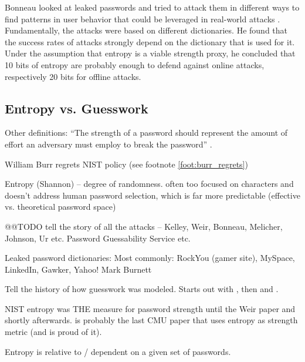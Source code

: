 Bonneau looked at leaked passwords and tried to attack them in different ways to find patterns in user behavior that could be leveraged in real-world attacks \cite{Bonneau2012ScienceOfGuessing}. Fundamentally, the attacks were based on different dictionaries. He found that the success rates of attacks strongly depend on the dictionary that is used for it. Under the assumption that entropy is a viable strength proxy, he concluded that 10 bits of entropy are probably enough to defend against online attacks, respectively 20 bits for offline attacks. 

\cite{Peisert2013PriciplesAuthentication,Bonneau2012ScienceOfGuessing,Scott1995GDMS,Dellamico2015MonteCarlo,Ur2015MeasuringRealWorldAccuracies,Egelman2015SeBIS,Conklin2004PWAuthenticationSystemPerspective,Schmidt2013Pitfalls,Kelley2012GuessAgain,Mazurek2013Measuring,Weir2010MetricsPolicies}

	\subsection{Entropy vs. Guesswork}
	
	Other definitions: ``The strength of a password should represent the amount of effort an adversary must employ to break the password'' \cite{Carnavalet2014AnalyzingPWStrengthMeters}.
	
	William Burr regrets NIST policy (see footnote \ref{foot:burr_regrets})	
	
	Entropy (Shannon) -- degree of randomness. often too focused on characters and doesn't address human password selection, which is far more predictable 
	(effective vs. theoretical password space)
	
	@@TODO tell the story of all the attacks -- Kelley, Weir, Bonneau, Melicher, Johnson, Ur etc. Password Guessability Service etc. 
	
	Leaked password dictionaries: Most commonly: RockYou (gamer site), MySpace, LinkedIn, Gawker, Yahoo!
	Mark Burnett  \cite{Burnett2005PerfectPasswords} 
	
	Tell the history of how guesswork was modeled. Starts out with \cite{Weir2010MetricsPolicies}, then \cite{Kelley20012GuessAgain} and \cite{Bonneau2012ScienceOfGuessing}. 
	
	NIST entropy was THE measure for password strength until the Weir paper and shortly afterwards. \cite{Komanduri2011OfPasswordsAndPeople} is probably the last CMU paper that uses entropy as strength metric (and is proud of it).
	
	Entropy is relative to / dependent on a given set of passwords. 
	
